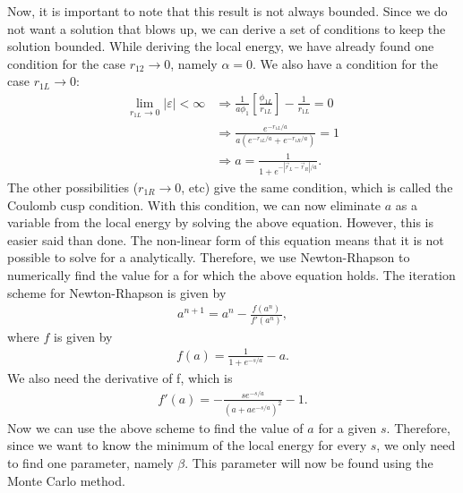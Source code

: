 Now, it is important to note that this result is not always bounded. Since we do not want a solution that blows up, we can derive a set of conditions to keep the solution bounded. While deriving the local energy, we have already found one condition for the case $r_{12}\rightarrow0$, namely $\alpha=0$.
We also have a condition for the case $r_{1L}\rightarrow0$:
\begin{align}
\mathop {\lim }\limits_{{r_{1L}} \to 0} \left| \varepsilon  \right| < \infty  &\Rightarrow \frac{1}{{a{\phi _1}}}\left[ {\frac{{{\phi _{1L}}}}{{{r_{1L}}}}} \right] - \frac{1}{{{r_{1L}}}} = 0\nonumber\\& \Rightarrow \frac{{{e^{ - {r_{1L}}/a}}}}{{a\left( {{e^{ - {r_{1L}}/a}} + {e^{ - {r_{1R}}/a}}} \right)}} = 1\nonumber\\&
 \Rightarrow a = \frac{1}{{1 + {e^{ - \left| {{{\vec r}_L} - {{\vec r}_R}} \right|/a}}}}.
\end{align}
The other possibilities ($r_{1R}\rightarrow0$, etc) give the same condition, which is called the Coulomb cusp condition. With this condition, we can now eliminate $a$ as a variable from the local energy by solving the above equation.
However, this is easier said than done. The non-linear form of this equation means that it is not possible to solve for a analytically. Therefore, we use Newton-Rhapson to numerically find the value for a for which the above equation holds.
\noindent The iteration scheme for Newton-Rhapson is given by
\begin{align}
{a^{n + 1}} = {a^n} - \frac{{f\left( {{a^n}} \right)}}{{f'\left( {{a^n}} \right)}},
\end{align}
where $f$ is given by
\begin{align}
f\left( a \right) = \frac{1}{{1 + {e^{ - s/a}}}} - a.
\end{align}
We also need the derivative of f, which is
\begin{align}
f'\left( a \right) =  - \frac{{s{e^{ - s/a}}}}{{{{\left( {a + a{e^{ - s/a}}} \right)}^2}}} - 1.
\end{align}
Now we can use the above scheme to find the value of $a$ for a given $s$. Therefore, since we want to know the minimum of the local energy for every $s$, we only need to find one parameter, namely $\beta$. This parameter will now be found using the Monte Carlo method. 
